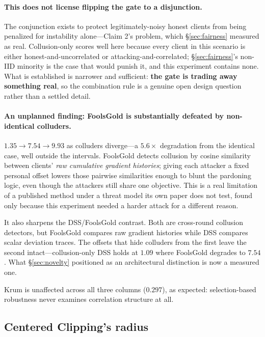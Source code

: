 \documentclass[11pt,a4paper]{article}
\begin{document}
\paragraph{This does not license flipping the gate to a disjunction.} The
conjunction exists to protect legitimately-noisy honest clients from being
penalized for instability alone---Claim 2's problem, which
\S\ref{sec:fairness} measured as real. Collusion-only scores well here
because every client in this scenario is either honest-and-uncorrelated or
attacking-and-correlated; \S\ref{sec:fairness}'s non-IID minority is the
case that would punish it, and this experiment contains none. What is
established is narrower and sufficient: \textbf{the gate is trading away
something real}, so the combination rule is a genuine open design question
rather than a settled detail.

\paragraph{An unplanned finding: FoolsGold is substantially defeated by
non-identical colluders.} $1.35 \rightarrow 7.54 \rightarrow 9.93$ as
colluders diverge---a $5.6\times$ degradation from the identical case,
well outside the intervals. FoolsGold detects collusion by cosine
similarity between clients' \emph{raw cumulative gradient histories};
giving each attacker a fixed personal offset lowers those pairwise
similarities enough to blunt the pardoning logic, even though the
attackers still share one objective. This is a real limitation of a
published method under a threat model its own paper does not test, found
only because this experiment needed a harder attack for a different reason.

It also sharpens the DSS/FoolsGold contrast. Both are cross-round
collusion detectors, but FoolsGold compares raw gradient histories while
DSS compares scalar deviation traces. The offsets that hide colluders from
the first leave the second intact---collusion-only DSS holds at $1.09$
where FoolsGold degrades to $7.54$. What \S\ref{sec:novelty} positioned as
an architectural distinction is now a measured one.

Krum is unaffected across all three columns ($0.297$), as expected:
selection-based robustness never examines correlation structure at all.

\subsection{Centered Clipping's radius}
\end{document}
